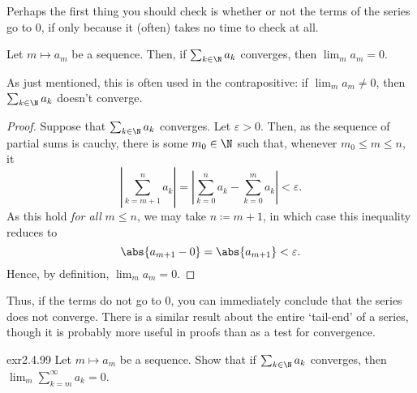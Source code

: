 Perhaps the first thing you should check is whether or not the terms of the series go to $0$, if only because it (often) takes no time to check at all.
\begin{prp}{}{}
Let $m\mapsto a_m$ be a sequence.  Then, if $\sum _{k\in \N}a_k$ converges, then $\lim _ma_m=0$.
\begin{rmk}
As just mentioned, this is often used in the contrapositive:  if $\lim _ma_m\neq 0$, then $\sum _{k\in \N}a_k$ doesn't converge.
\end{rmk}
\begin{proof}
Suppose that $\sum _{k\in \N}a_k$ converges.  Let $\varepsilon >0$.  Then, as the sequence of partial sums is cauchy, there is some $m_0\in \N$ such that, whenever $m_0\leq m\leq n$, it 
\begin{equation}
\left| \sum _{k=m+1}^na_k\right| =\left| \sum _{k=0}^na_k-\sum _{k=0}^ma_k\right| <\varepsilon .
\end{equation}
As this hold \emph{for all} $m\leq n$, we may take $n\coloneqq m+1$, in which case this inequality reduces to
\begin{equation}
\abs{a_{m+1}-0}=\abs{a_{m+1}}<\varepsilon .
\end{equation}
Hence, by definition, $\lim _ma_m=0$.
\end{proof}
\end{prp}
Thus, if the terms do not go to $0$, you can immediately conclude that the series does not converge.  There is a similar result about the entire `tail-end' of a series, though it is probably more useful in proofs than as a test for convergence.
\begin{exr}{}{exr2.4.99}
Let $m\mapsto a_m$ be a sequence.  Show that if $\sum _{k\in \N}a_k$ converges, then $\lim _m\sum _{k=m}^{\infty}a_k=0$.
\end{exr}
